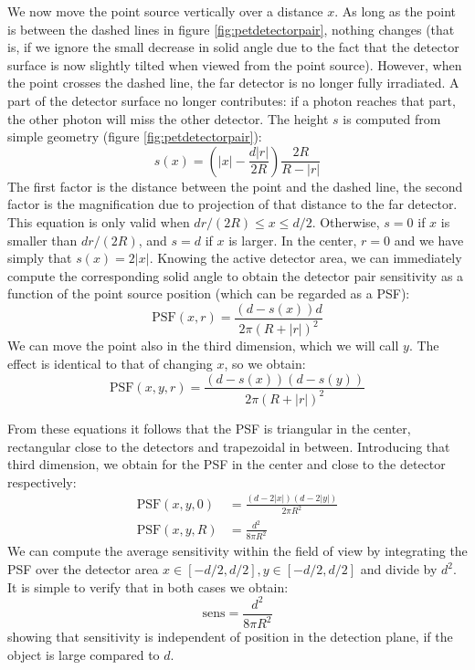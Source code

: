 \documentclass[11pt,oneside]{article}
\begin{document}
We now move the point source vertically over a distance $x$. As long as the
point is between the dashed lines in figure \ref{fig:petdetectorpair}, nothing
changes (that is, if we ignore the small decrease in solid angle due to the
fact that the detector surface is now slightly tilted when viewed from the
point source). However, when the point crosses the dashed line, the far
detector is no longer fully irradiated. A part of the detector surface no
longer contributes: if a photon reaches that part, the other photon will miss
the other detector. The height $s$ is computed from simple geometry (figure
\ref{fig:petdetectorpair}):
\begin{equation}
  s(x) = \left( |x| - \frac{d |r|}{2 R} \right) \frac{2R}{R-|r|}
\end{equation}
The first factor is the distance between the point and the dashed line, the
second factor is the magnification due to projection of that distance to the
far detector. This equation is only valid when $d r / (2R) \leq x \leq
d/2$. Otherwise, $s = 0$ if $x$ is smaller than $dr/(2R)$, and $s = d$ if $x$
is larger. In the center, $r = 0$ and we have simply that $s(x) = 2 |x|$.
Knowing the active detector area, we can immediately compute the
corresponding solid angle to obtain the detector pair sensitivity as a
function of the point source position (which can be regarded as a PSF):
\begin{equation}
 \mbox{PSF}(x, r) = \frac{(d - s(x)) d}{2 \pi (R+|r|)^2}
\end{equation}
We can move the point also in the third dimension, which we will call $y$. The
effect is identical to that of changing $x$, so we obtain:
\begin{equation}
 \mbox{PSF}(x, y, r) = \frac{(d - s(x)) (d - s(y))}{2 \pi (R+|r|)^2}
\end{equation}

From these equations it follows that the PSF is triangular in the center,
rectangular close to the detectors and trapezoidal in between.  Introducing
that third dimension, we obtain for the PSF in the center and close to the
detector respectively:
\begin{align}
  \mbox{PSF}(x, y, 0) &= \frac{(d - 2|x|)(d - 2 |y|)}{2 \pi R^2}\\
  \mbox{PSF}(x, y, R) &= \frac{d^2}{8 \pi R^2}
\end{align}
We can compute the average sensitivity within the field of view by integrating
the PSF over the detector area $x \in [-d/2, d/2], y \in [-d/2,
d/2]$ and divide by $d^2$. It is simple to verify that in both cases we obtain:
\begin{equation}
  \mbox{sens} = \frac{d^2}{8 \pi R^2} \label{eq:pet_totsens}
\end{equation}
showing that sensitivity is independent of position in the detection plane, if
the object is large compared to $d$.
\end{document}
